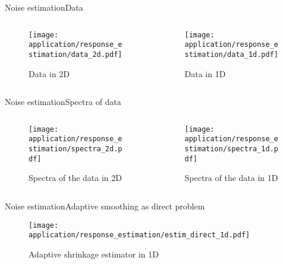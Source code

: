 \begin{frame}{Noise estimation}{Data}
\begin{columns}
\begin{column}{8cm}
\begin{figure}[H]
		\label{data_2d}\caption{Data in 2D}
		\centering
    	\texttt{[image: application/response\_estimation/data\_2d.pdf]}
	\end{figure}
\end{column}
\begin{column}{8cm}
\begin{figure}[H]
		\label{data_1d}\caption{Data in 1D}
		\centering
    	\texttt{[image: application/response\_estimation/data\_1d.pdf]}
	\end{figure}
\end{column}
\end{columns}
\end{frame}

\begin{frame}{Noise estimation}{Spectra of data}
\begin{columns}
\begin{column}{8cm}
\begin{figure}[H]
		\label{edge_2d}\caption{Spectra of the data in 2D}
		\centering
    	\texttt{[image: application/response\_estimation/spectra\_2d.pdf]}
	\end{figure}
\end{column}
\begin{column}{8cm}
\begin{figure}[H]
		\label{edge_2d}\caption{Spectra of the data in 1D}
		\centering
    	\texttt{[image: application/response\_estimation/spectra\_1d.pdf]}
	\end{figure}
\end{column}
\end{columns}
\end{frame}

\begin{frame}{Noise estimation}{Adaptive smoothing as direct problem}
\begin{figure}[H]
		\label{edge_2d}\caption{Adaptive shrinkage estimator in 1D}
		\centering
    	\texttt{[image: application/response\_estimation/estim\_direct\_1d.pdf]}
	\end{figure}
\end{frame}

